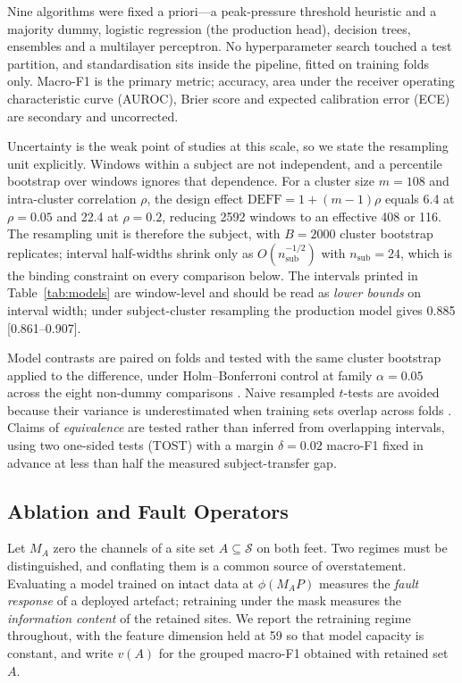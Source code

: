 \documentclass[10pt,conference,a4paper]{IEEEtran}
\begin{document}
Nine algorithms were fixed a priori---a peak-pressure threshold heuristic and a
majority dummy, logistic regression (the production head), decision trees,
ensembles and a multilayer perceptron. No hyperparameter search touched a test
partition, and standardisation sits inside the pipeline, fitted on training
folds only. Macro-F1 is the primary metric; accuracy, area under the receiver
operating characteristic curve (AUROC), Brier score and expected calibration
error (ECE) are secondary and uncorrected.

Uncertainty is the weak point of studies at this scale, so we state the
resampling unit explicitly. Windows within a subject are not independent, and a
percentile bootstrap over windows ignores that dependence. For a cluster size
$m=108$ and intra-cluster correlation $\rho$, the design effect
$\mathrm{DEFF}=1+(m-1)\rho$ equals 6.4 at $\rho=0.05$ and 22.4 at $\rho=0.2$,
reducing 2592 windows to an effective 408 or 116. The resampling unit is
therefore the subject, with $B=2000$ cluster bootstrap replicates; interval
half-widths shrink only as $O(n_{\mathrm{sub}}^{-1/2})$ with
$n_{\mathrm{sub}}=24$, which is the binding constraint on every comparison
below. The intervals printed in Table~\ref{tab:models} are window-level and
should be read as \emph{lower bounds} on interval width; under subject-cluster
resampling the production model gives 0.885 [0.861--0.907].

Model contrasts are paired on folds and tested with the same cluster bootstrap
applied to the difference, under Holm--Bonferroni control at family
$\alpha=0.05$ across the eight non-dummy comparisons \cite{holm1979}. Naive
resampled $t$-tests are avoided because their variance is underestimated when
training sets overlap across folds \cite{nadeau2003}. Claims of
\emph{equivalence} are tested rather than inferred from overlapping intervals,
using two one-sided tests (TOST) with a margin $\delta=0.02$ macro-F1 fixed in
advance at less than half the measured subject-transfer gap.

\subsection{Ablation and Fault Operators}
\label{sec:ops}

Let $M_A$ zero the channels of a site set $A\subseteq\mathcal{S}$ on both feet.
Two regimes must be distinguished, and conflating them is a common source of
overstatement. Evaluating a model trained on intact data at $\phi(M_A P)$
measures the \emph{fault response} of a deployed artefact; retraining under the
mask measures the \emph{information content} of the retained sites. We report
the retraining regime throughout, with the feature dimension held at 59 so that
model capacity is constant, and write $v(A)$ for the grouped macro-F1 obtained
with retained set $A$.
\end{document}
